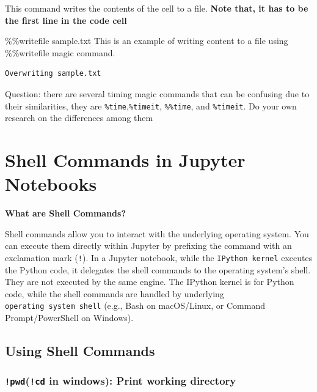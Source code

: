 \documentclass[
  letterpaper,
  DIV=11,
  numbers=noendperiod]{scrreprt}
\newenvironment{Shaded}{\begin{snugshade}}{\end{snugshade}}
\newcommand{\BuiltInTok}[1]{\textcolor[rgb]{0.00,0.23,0.31}{#1}}
\newcommand{\KeywordTok}[1]{\textcolor[rgb]{0.00,0.23,0.31}{#1}}
\newcommand{\NormalTok}[1]{\textcolor[rgb]{0.00,0.23,0.31}{#1}}
\newcommand{\OperatorTok}[1]{\textcolor[rgb]{0.37,0.37,0.37}{#1}}
\begin{document}
This command writes the contents of the cell to a file. \textbf{Note
that, it has to be the first line in the code cell}

\begin{Shaded}
\begin{Highlighting}[]
\OperatorTok{\%\%}\NormalTok{writefile sample.txt}
\NormalTok{This }\KeywordTok{is}\NormalTok{ an example of writing content to a }\BuiltInTok{file}\NormalTok{ using }\OperatorTok{\%\%}\NormalTok{writefile magic command.}
\end{Highlighting}
\end{Shaded}

\begin{verbatim}
Overwriting sample.txt
\end{verbatim}

Question: there are several timing magic commands that can be confusing
due to their similarities, they are \texttt{\%time},\texttt{\%timeit},
\texttt{\%\%time}, and \texttt{\%timeit}. Do your own research on the
differences among them

\hypertarget{shell-commands-in-jupyter-notebooks}{%
\section{Shell Commands in Jupyter
Notebooks}\label{shell-commands-in-jupyter-notebooks}}

\textbf{What are Shell Commands?}

Shell commands allow you to interact with the underlying operating
system. You can execute them directly within Jupyter by prefixing the
command with an exclamation mark (\texttt{!}). In a Jupyter notebook,
while the \texttt{IPython\ kernel} executes the Python code, it
delegates the shell commands to the operating system's shell. They are
not executed by the same engine. The IPython kernel is for Python code,
while the shell commands are handled by underlying
\texttt{operating\ system\ shell} (e.g., Bash on macOS/Linux, or Command
Prompt/PowerShell on Windows).

\hypertarget{using-shell-commands}{%
\subsection{Using Shell Commands}\label{using-shell-commands}}

\hypertarget{pwdcd-in-windows-print-working-directory}{%
\subsubsection{\texorpdfstring{\texttt{!pwd}(\texttt{!cd} in windows):
Print working
directory}{!pwd(!cd in windows): Print working directory}}\label{pwdcd-in-windows-print-working-directory}}
\end{document}
